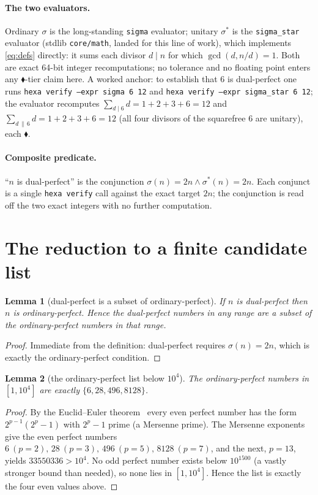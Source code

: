 \documentclass[11pt,a4paper]{article}
\newcommand{\sig}{\sigma}
\newcommand{\sigs}{\sigma^{*}}
\newcommand{\formal}{\textcolor{blue!60!black}{$\blacklozenge$}}
\theoremstyle{plain}
\newtheorem{lemma}{Lemma}
\theoremstyle{definition}
\begin{document}
\paragraph{The two evaluators.} Ordinary $\sig$ is the long-standing
\texttt{sigma} evaluator; unitary $\sigs$ is the \texttt{sigma\_star} evaluator
(stdlib \texttt{core/math}, landed for this line of work), which implements
\eqref{eq:defs} directly: it sums each divisor $d\mid n$ for which
$\gcd(d,n/d)=1$. Both are exact 64-bit integer recomputations; no tolerance and
no floating point enters any \formal-tier claim here. A worked anchor: to
establish that $6$ is dual-perfect one runs \texttt{hexa verify --expr sigma 6
12} and \texttt{hexa verify --expr sigma\_star 6 12}; the evaluator recomputes
$\sum_{d\mid6}d=1+2+3+6=12$ and $\sum_{d\,\|\,6}d=1+2+3+6=12$ (all four divisors
of the squarefree $6$ are unitary), each \formal.

\paragraph{Composite predicate.} ``$n$ is dual-perfect'' is the conjunction
$\sig(n)=2n \wedge \sigs(n)=2n$. Each conjunct is a single \texttt{hexa verify}
call against the exact target $2n$; the conjunction is read off the two exact
integers with no further computation.

\section{The reduction to a finite candidate list}
\label{sec:reduction}

\begin{lemma}[dual-perfect is a subset of ordinary-perfect]
\label{lem:subset}
If $n$ is dual-perfect then $n$ is ordinary-perfect. Hence the dual-perfect
numbers in any range are a subset of the ordinary-perfect numbers in that range.
\end{lemma}
\begin{proof}
Immediate from the definition: dual-perfect requires $\sig(n)=2n$, which is
exactly the ordinary-perfect condition.
\end{proof}

\begin{lemma}[the ordinary-perfect list below $10^4$]
\label{lem:eulerlist}
The ordinary-perfect numbers in $[1,10^4]$ are exactly
$\{6,28,496,8128\}$.
\end{lemma}
\begin{proof}
By the Euclid--Euler theorem~\citep{dickson} every even perfect number has the
form $2^{p-1}(2^p-1)$ with $2^p-1$ prime (a Mersenne prime). The Mersenne
exponents give the even perfect numbers $6\ (p{=}2),\,28\ (p{=}3),\,496\
(p{=}5),\,8128\ (p{=}7)$, and the next, $p=13$, yields $33550336>10^4$. No odd
perfect number exists below $10^{1500}$ (a vastly stronger bound than needed),
so none lies in $[1,10^4]$. Hence the list is exactly the four even values
above. \qedhere
\end{proof}
\end{document}
